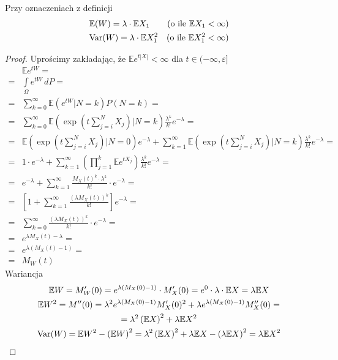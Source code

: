 \begin{twr}
Przy oznaczeniach z definicji
\begin{align*}
&\mathbb E (W)=\lambda\cdot \mathbb E X_1 &(\text{o ile }\mathbb E X_1<\infty )\\
&\text{Var}(W)=\lambda\cdot \mathbb E X_1^2 &(\text{o ile }\mathbb E X_1^2<\infty )
\end{align*}
\begin{proof}
Uprościmy zakładając, że $ \mathbb E e^{t|X|}<\infty $ dla $ t\in (-\infty ,\varepsilon] $
\begin{align*}
&\mathbb E e^{tW}
=\\=&
\int\limits_{\Omega}e^{tW}\,dP
=\\=&
\sum_{k=0}^{\infty }\mathbb E \left(e^{tW}|N=k\right)P(N=k)
=\\=&
\sum_{k=0}^{\infty }\mathbb E \left(\exp \left(t\sum_{j=i}^{N}X_j\right)|N=k\right)\frac{\lambda^k}{k!}e^{-\lambda}
=\\=&
\mathbb E \left(\exp \left(t\sum_{j=i}^{N}X_j\right)|N=0\right)e^{-\lambda}+
\sum_{k=1}^{\infty }
\mathbb E \left(\exp \left(t\sum_{j=i}^{N}X_j\right)|N=k\right)\frac{\lambda^k}{k!}e^{-\lambda}
=\\=&
1\cdot e^{-\lambda}+
\sum_{k=1}^{\infty }
\left(\prod_{j=1}^{k}\mathbb E e^{tX_j}\right)
\frac{\lambda^k}{k!}e^{-\lambda}
=\\=&
e^{-\lambda}+
\sum_{k=1}^{\infty }
\frac{M_X(t)^k\cdot\lambda^k}{k!}\cdot e^{-\lambda}
=\\=&
\left[1+\sum_{k=1}^{\infty }\frac{(\lambda M_X(t))^k}{k!}\right]e^{-\lambda}
=\\=&
\sum_{k=0}^{\infty }\frac{(\lambda M_X(t))^k}{k!}\cdot e^{-\lambda}
=\\=&
e^{\lambda M_X(t)-\lambda}
=\\=&
e^{\lambda(M_X(t)-1)}
=\\=&
M_W(t)
\end{align*}
Wariancja
\begin{gather*}
\mathbb E W=M_W'(0)=
e^{\lambda(M_X(0)-1)}\cdot M_X'(0)=
e^0\cdot\lambda\cdot \mathbb E X=
\lambda \mathbb E X\\
\mathbb E W^2=M''(0)=
\lambda ^2 e^{\lambda  \left(M_X(0)-1\right)} M_X'(0)^2+\lambda  e^{\lambda    \left(M_X(0)-1\right)} M_X''(0)
=\\=
\lambda ^2 \left(\mathbb E X\right)^2+\lambda \mathbb E X^2\\
\text{Var}(W)=\mathbb E W^2-\left(\mathbb E W\right)^2=
\lambda ^2 \left(\mathbb E X\right)^2+\lambda \mathbb EX-
\left(\lambda \mathbb E X\right)^2=\lambda \mathbb E X^2
\end{gather*}
\end{proof}
\end{twr}
